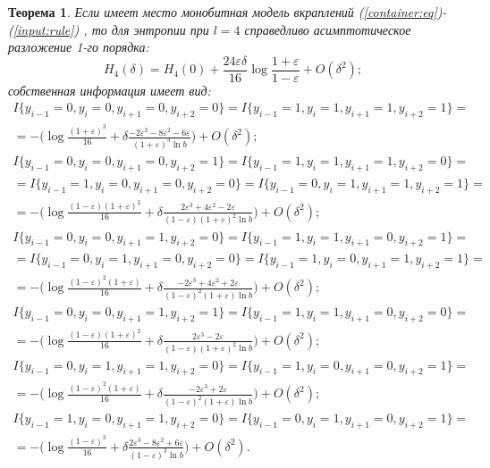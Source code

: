 \documentclass[a4paper,12pt]{article}
\theoremstyle{plain}
\newtheorem{theorem}{Теорема}[section]
\begin{document}
\begin{theorem}
	Если имеет место монобитная модель вкраплений (\ref{container:eq})-(\ref{input:rule}) , то для энтропии при $l=4$ справедливо асимптотическое разложение 1-го порядка:
	\begin{equation}
		H_4(\delta)=H_4(0)+\frac{24\varepsilon\delta}{16} \log\frac{1+\varepsilon}{1-\varepsilon}+ O(\delta^2);
	\end{equation}
	собственная информация имеет вид:\\
	\begin{gather*}
		I\{y_{i-1} = 0, y_i = 0, y_{i+1} = 0, y_{i+2} = 0 \}=I\{y_{i-1} = 1, y_i = 1, y_{i+1} = 1, y_{i+2} = 1 \}=\\= -\biggr(\log\frac{(1+\varepsilon)^3}{16} + \delta \frac{-2\varepsilon^3-8\varepsilon^2-6\varepsilon}{(1+\varepsilon)^3\ln b}\biggr) +O(\delta^2) ;\\
		I\{y_{i-1} = 0, y_i = 0, y_{i+1} = 0, y_{i+2} = 1 \}=I\{y_{i-1} = 1, y_i = 1, y_{i+1} = 1, y_{i+2} = 0 \}=\\=
		I\{y_{i-1} = 1, y_i = 0, y_{i+1} = 0, y_{i+2} = 0 \}=I\{y_{i-1} = 0, y_i = 1, y_{i+1} = 1, y_{i+2} = 1 \}=\\= -\biggr(\log\frac{(1-\varepsilon)(1+\varepsilon)^2}{16} + \delta \frac{2\varepsilon^3+4\varepsilon^2-2\varepsilon}{(1-\varepsilon)(1+\varepsilon)^2\ln b}\biggr) +O(\delta^2);\\
		I\{y_{i-1} = 0, y_i = 0, y_{i+1} = 1, y_{i+2} = 0 \}=I\{y_{i-1} = 1, y_i = 1, y_{i+1} = 0, y_{i+2} = 1 \}=\\=
		I\{y_{i-1} = 0, y_i = 1, y_{i+1} = 0, y_{i+2} = 0 \}=I\{y_{i-1} = 1, y_i = 0, y_{i+1} = 1, y_{i+2} = 1 \}=\\=
		-\biggr(\log\frac{(1-\varepsilon)^2(1+\varepsilon)}{16} + \delta \frac{-2\varepsilon^3+4\varepsilon^2+2\varepsilon}{(1-\varepsilon)^2(1+\varepsilon)\ln b}\biggr) +O(\delta^2);\\
		I\{y_{i-1} = 0, y_i = 0, y_{i+1} = 1, y_{i+2} = 1 \}=I\{y_{i-1} = 1, y_i = 1, y_{i+1} = 0, y_{i+2} = 0 \}=\\= -\biggr(\log\frac{(1-\varepsilon)(1+\varepsilon)^2}{16} + \delta \frac{2\varepsilon^3-2\varepsilon}{(1-\varepsilon)(1+\varepsilon)^2\ln b}\biggr) +O(\delta^2);    \\
		I\{y_{i-1} = 0, y_i = 1, y_{i+1} = 1, y_{i+2} = 0 \}=I\{y_{i-1} = 1, y_i = 0, y_{i+1} = 0, y_{i+2} = 1 \}=\\= -\biggr(\log\frac{(1-\varepsilon)^2(1+\varepsilon)}{16} + \delta \frac{-2\varepsilon^3+2\varepsilon}{(1-\varepsilon)^2(1+\varepsilon)\ln b}\biggr) +O(\delta^2);\\  
		I\{y_{i-1} = 1, y_i = 0, y_{i+1} = 1, y_{i+2} = 0 \}=I\{y_{i-1} = 0, y_i = 1, y_{i+1} = 0, y_{i+2} = 1 \}=\\= -\biggr(\log\frac{(1-\varepsilon)^3}{16} + \delta \frac{2\varepsilon^3-8\varepsilon^2+6\varepsilon}{(1-\varepsilon)^3\ln b}\biggr) +O(\delta^2).
	\end{gather*}
\end{theorem}
\end{document}
